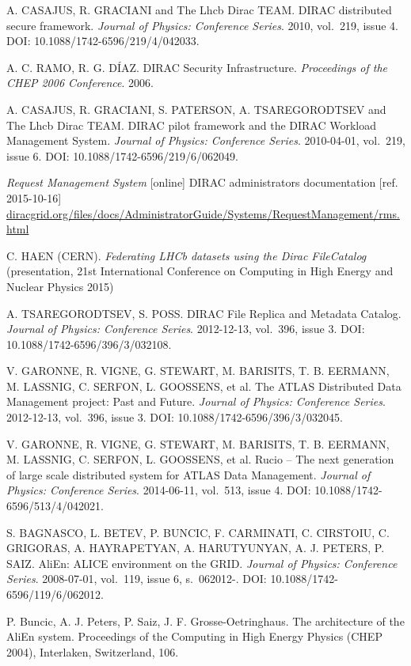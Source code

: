 \begin{thebibliography}{99}
	A. CASAJUS,  R. GRACIANI and The Lhcb Dirac TEAM. 
	DIRAC distributed secure framework. 
	\textit{Journal of Physics: Conference Series}. 2010, vol.~219, issue 4. 
	DOI: 10.1088/1742-6596/219/4/042033. 

	A. C. RAMO, R. G. DÍAZ. 
	DIRAC Security Infrastructure. 
	\textit{Proceedings of the CHEP 2006 Conference}. 2006. 
	
	A. CASAJUS, R. GRACIANI, S. PATERSON, A. TSAREGORODTSEV and The Lhcb Dirac TEAM. 
	DIRAC pilot framework and the DIRAC Workload Management System. 
	\textit{Journal of Physics: Conference Series}. 2010-04-01, vol.~219, issue 6. 
	DOI: 10.1088/1742-6596/219/6/062049. 
	
	\emph{Request Management System} [online] 
	DIRAC administrators documentation [ref. 2015-10-16]
	\url{diracgrid.org/files/docs/AdministratorGuide/Systems/RequestManagement/rms.html}
	
	C. HAEN (CERN).	
	\textit{Federating LHCb datasets using the Dirac FileCatalog}
	(presentation, 21st International Conference on Computing in High Energy and Nuclear Physics 2015)
	
	A. TSAREGORODTSEV, S. POSS. 
	DIRAC File Replica and Metadata Catalog. 
	\textit{Journal of Physics: Conference Series}. 2012-12-13, vol.~396, issue 3. 
	DOI: 10.1088/1742-6596/396/3/032108. 
	
	V. GARONNE, R. VIGNE, G. STEWART, M. BARISITS, T. B. EERMANN, M. LASSNIG, C. SERFON, L. GOOSSENS, et al. 
	The ATLAS Distributed Data Management project: Past and Future. 
	\textit{Journal of Physics: Conference Series}. 2012-12-13, vol.~396, issue 3.
	DOI: 10.1088/1742-6596/396/3/032045. 
	
	V. GARONNE, R. VIGNE, G. STEWART, M. BARISITS, T. B. EERMANN, M. LASSNIG, C. SERFON, L. GOOSSENS, et al. 
	Rucio – The next generation of large scale distributed system for ATLAS Data Management. 
	\textit{Journal of Physics: Conference Series}. 2014-06-11, vol.~513, issue 4.
	DOI: 10.1088/1742-6596/513/4/042021.
	
	S. BAGNASCO, L. BETEV, P. BUNCIC, F. CARMINATI, C. CIRSTOIU, C. GRIGORAS, A. HAYRAPETYAN, A. HARUTYUNYAN, 
	A. J. PETERS, P. SAIZ. 
	AliEn: ALICE environment on the GRID. 
	\textit{Journal of Physics: Conference Series}. 2008-07-01, vol.~119, issue 6, s.~062012-. 
	DOI: 10.1088/1742-6596/119/6/062012.

	P. Buncic, A. J. Peters, P. Saiz, J. F. Grosse-Oetringhaus. 
	The architecture of the AliEn system. Proceedings of the Computing in High Energy Physics (CHEP 2004), 				
	Interlaken, Switzerland, 106.
	

\end{thebibliography}
